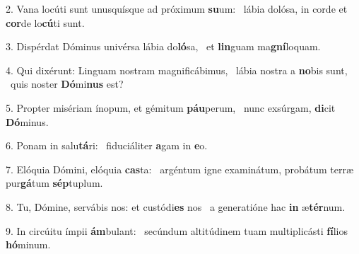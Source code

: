 2. Vana locúti sunt unusquísque ad próximum \textbf{su}um: \ast\  lábia dolósa, in corde et \textbf{cor}de lo\textbf{cú}ti sunt.\

3. Dispérdat Dóminus univérsa lábia do\textbf{ló}sa, \ast\  et \textbf{lin}guam ma\textbf{gní}loquam.\

4. Qui dixérunt: Linguam nostram magnificábimus, \dag\  lábia nostra a \textbf{no}bis sunt, \ast\  quis noster \textbf{Dó}mi\textbf{nus} est?\

5. Propter misériam ínopum, et gémitum \textbf{páu}perum, \ast\  nunc exsúrgam, \textbf{di}cit \textbf{Dó}minus.\

6. Ponam in salu\textbf{tá}ri: \ast\  fiduciáliter \textbf{a}gam in \textbf{e}o.\

7. Elóquia Dómini, elóquia \textbf{cas}ta: \ast\  argéntum igne examinátum, probátum terræ pur\textbf{gá}tum \textbf{sép}tuplum.\

8. Tu, Dómine, servábis nos: et custódi\textbf{es} nos \ast\  a generatióne hac \textbf{in} æ\textbf{tér}num.\

9. In circúitu ímpii \textbf{ám}bulant: \ast\  secúndum altitúdinem tuam multiplicásti \textbf{fí}lios \textbf{hó}minum.\

